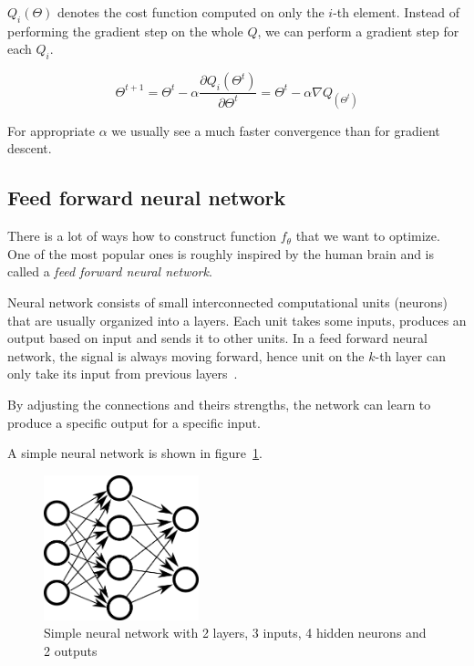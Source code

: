     $Q_i(\Theta)$ denotes the cost function computed on only the $i$-th element. 
    Instead of performing the gradient step on the whole $Q$, 
    we can perform a gradient step for each $Q_i$. 

    \begin{equation}
    \Theta^{t+1} = \Theta^t - \alpha \frac{\partial Q_i(\Theta^t)}{\partial \Theta^t} = \Theta^t - \alpha \nabla Q_(\Theta^t)
    \label{eq:stochastic:gradient:descent}
    \end{equation}
    
    For appropriate $\alpha$ we usually see a much faster convergence than for gradient descent.
    
    \subsection{Feed forward neural network}
    There is a lot of ways how to construct function $f_\theta$ that we want to optimize. 
    One of the most popular ones is roughly inspired by the human brain and is called a \textit{feed forward neural network}.
    
    Neural network consists of small interconnected computational units (neurons) that are usually organized into a layers.
    Each unit takes some inputs, produces an output based on input and sends it to other units. 
    In a feed forward neural network, the signal is always moving forward,
    hence unit on the $k$-th layer can only take its input from previous layers~\cite{Goodfellow-et-al-2016}.
    
    By adjusting the connections and theirs strengths, the network can learn to produce a specific output for a specific input.
    
    A simple neural network is shown in figure~\ref{obr:siet}.
    
    \begin{figure}[h]
    \centerline{\includegraphics[width=0.4\textwidth]{images/neural_network}}
    \caption[Simple neural network]{Simple neural network with 2 layers, 3 inputs, 4 hidden neurons and 2 outputs}
    \label{obr:siet}
    \end{figure}
    
